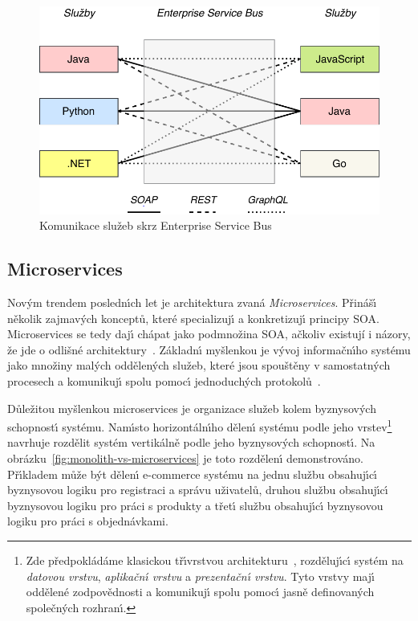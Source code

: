 \begin{figure}
    \centering
    \includegraphics[keepaspectratio=true, width=0.7\linewidth]{figures/enterprise-service-bus.pdf}
    \caption{Komunikace služeb skrz Enterprise Service Bus}
    \label{fig:enterprise-service-bus}
\end{figure}

\subsection{Microservices}\label{sec:microservices}

Nov\'ym trendem posledn\'{\i}ch let je architektura zvaná \textit{Microservices}.
Přináš\'{\i} několik zajmav\'ych konceptů, které specializuj\'{\i} a konkretizuj\'{\i}
principy \gls{SOA}. Microservices se tedy daj\'{\i} chápat jako podmnožina
\gls{SOA}, ačkoliv existují i názory, že jde o odlišné architektury~\cite{richards2015microservices}.
Základn\'{\i} myšlenkou je v\'yvoj informačn\'{\i}ho systému jako množiny
mal\'ych oddělen\'ych služeb, které jsou spouštěny v samostatn\'ych procesech
a komunikuj\'{\i} spolu pomoc\'{\i} jednoduch\'ych protokolů~\cite{lewis2014microservices}.

Důležitou myšlenkou microservices je organizace služeb kolem
byznysov\'ych schopnost\'{\i} systému. Nam\'{\i}sto horizontáln\'{\i}ho dělen\'{\i} systému
podle jeho vrstev\footnote{
Zde předpokládáme klasickou tř\'{\i}vrstvou architekturu~\cite{fowler2002patterns},
rozděluj\'{\i}c\'{\i} systém na \textit{datovou vrstvu}, \textit{aplikačn\'{\i} vrstvu}
a \textit{prezentačn\'{\i} vrstvu}. Tyto vrstvy maj\'{\i} oddělené zodpovědnosti a komunikuj\'{\i}
spolu pomoc\'{\i} jasně definovan\'ych společn\'ych rozhran\'{\i}.
} navrhuje rozdělit systém vertikálně podle jeho byznysov\'ych schopnost\'{\i}.
Na obrázku~\ref{fig:monolith-vs-microservices} je toto rozdělen\'{\i} demonstrováno.
Př\'{\i}kladem může b\'yt dělen\'{\i} e-commerce systému na jednu službu obsahuj\'{\i}c\'{\i} byznysovou
logiku pro registraci a správu uživatelů, druhou službu obsahuj\'{\i}c\'{\i} byznysovou logiku
pro práci s produkty a třet\'{\i} službu obsahuj\'{\i}c\'{\i} byznysovou logiku pro práci
s objednávkami.

